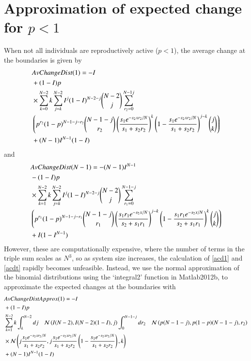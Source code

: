 \section{Approximation of expected change for $p<1$}
\label{app2e}
When not all individuals are reproductively active ($p<1$), the average change at the boundaries is given by
\begin{align}
\label{acd1}
&AvChangeDist(1)=-I \\ 
&+ (1-I)p \notag \\
& \times \sum_{k=0}^{N-2} k \sum_{j=k}^{N-2} I^j(1-I)^{N-2-j}{N-2\choose j} \sum_{r_2=0}^{N-1j} \notag \\
&\left( p^{r_2}(1-p)^{N-1-j-r_2} {N-1-j\choose r_2}\left( \frac{s_1 e^{-s_2xr_2/N}}{s_1+s_2r_2}\right)^k \left(1- \frac{s_1 e^{-s_2xr_2/N}}{s_1+s_2r_2}\right)^{j-k}{j\choose k} \right) \notag \\
&+(N-1)I^{N-1}(1-I) \notag
\end{align}
and
\begin{align}
\label{acdt}
&AvChangeDist(N-1)=-(N-1)I^{N-1}\\& - (1-I)p \notag \\
&\times \sum_{k=1}^{N-2}k\sum_{j=k}^{N-2} I^j(1-I)^{N-2-j} {N-2 \choose j} \sum_{r_1=0}^{N-1-j} \notag \\
&\left( p^{r_1}(1-p)^{N-1-j-r_1} {N-1-j\choose r_1}\left( \frac{s_1r_1 e^{-s_2x/N}}{s_2+s_1r_1}\right)^{j-k} \left(1- \frac{s_1r_1 e^{-s_2x/N}}{s_2+s_1r_1}\right)^k{j\choose k} \right) \notag \\
&+I(1-I^{N-1}) \notag
\end{align}
However, these are computationally expensive, where the number of terms in the triple sum scales as $N^3$, so as system size increases, the calculation of \eqref{acd1} and \eqref{acdt} rapidly becomes unfeasible. Instead, we use the normal approximation of the binomial distributions using the `integral2' function in Matlab2012b, to approximate the expected changes at the boundaries with 
\begin{align}
& AvChangeDistApprox(1)=-I \\
&+(1-I)p \notag \\
&\sum_{k=1}^{N-2} k \int_k^{N-2}dj\quad \mathcal{N}\left(I(N-2),I(N-2)(1-I),j\right) \int_0^{N-1-j}dr_2\quad \mathcal{N}\left(p(N-1-j),p(1-p)(N-1-j),r_2\right) \notag \\
&\times \mathcal{N}\left(j\frac{s_1 e^{-s_2xr_2/N}}{s_1+s_2r_2},j\frac{s_1 e^{-s_2xr_2/N}}{s_1+s_2r_2}\left(1-\frac{s_1 e^{-s_2xr_2/N}}{s_1+s_2r_2}\right),k \right)\notag \\
 &+(N-1)I^{N-1}(1-I)\notag
\end{align}
